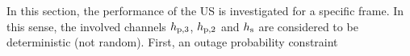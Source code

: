 In this section, the performance of the US is investigated for a specific frame. In this sense, the involved channels $h_{\text{p,3}}$, $h_{\text{p,2}}$ and $h_{\text{s}}$ are considered to be deterministic (not random).   
First, an outage probability constraint
